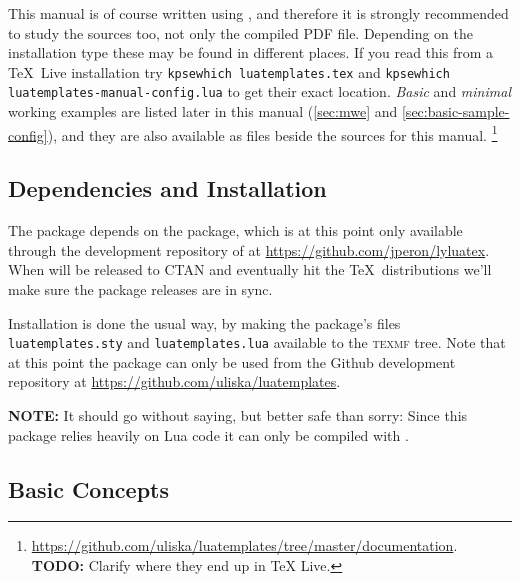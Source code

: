 \documentclass{scrartcl}
\begin{document}
This manual is of course written using , and therefore it
is strongly recommended to study the sources too, not only the compiled PDF
file.  Depending on the installation type these may be found in different
places.  If you read this from a \TeX\ Live installation try \texttt{kpsewhich
luatemplates.tex} and \texttt{kpsewhich luatemplates-manual-config.lua} to get
their exact location.  \emph{Basic} and \emph{minimal} working examples are
listed later in this manual (\vref{sec:mwe} and
\vref{sec:basic-sample-config}), and they are also available as files beside
the sources for this manual.%
\footnote{\url{https://github.com/uliska/luatemplates/tree/master/documentation}.\\
\textbf{TODO:} Clarify where they end up in TeX Live.}

\subsection{Dependencies and Installation}
\label{sec:dependencies-and-installation}

The package depends on the  package, which is at this
point only available through the development repository of  at
\url{https://github.com/jperon/lyluatex}.  When  will be
released to CTAN and eventually hit the \TeX\ distributions we'll make sure the
package releases are in sync.

Installation is done the usual way, by making the package's files
\texttt{luatemplates.sty} and \texttt{luatemplates.lua} available to the
\textsc{texmf} tree. Note that at this point the package can only be used from
the Github development repository at
\url{https://github.com/uliska/luatemplates}.

\textbf{NOTE:} It should go without saying, but better safe than sorry: Since
this package relies heavily on Lua code it can only be compiled with
.


\subsection{Basic Concepts}
\label{sec:basic-concepts}
\end{document}
